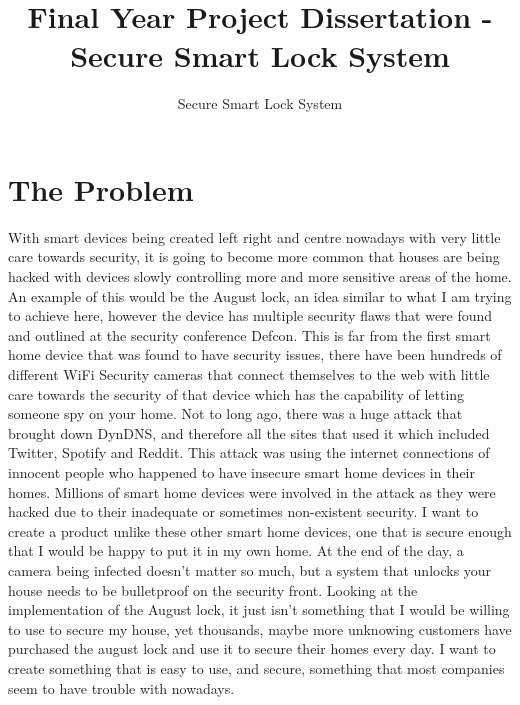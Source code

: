 \documentclass[10pt, a4paper]{article}
\begin{document}
\title{Final Year Project Dissertation - Secure Smart Lock System}
\author{Secure Smart Lock System}
\maketitle

\section{The Problem}
With smart devices being created left right and centre nowadays with very little care towards security, it is going to become more common that houses are being hacked with devices slowly controlling more and more sensitive areas of the home. An example of this would be the August lock, an idea similar to what I am trying to achieve here, however the device has multiple security flaws that were found and outlined at the security conference Defcon. This is far from the first smart home device that was found to have security issues, there have been hundreds of different WiFi Security cameras that connect themselves to the web with little care towards the security of that device which has the capability of letting someone spy on your home. Not to long ago, there was a huge attack that brought down DynDNS, and therefore all the sites that used it which included Twitter, Spotify and Reddit. This attack was using the internet connections of innocent people who happened to have insecure smart home devices in their homes. Millions of smart home devices were involved in the attack as they were hacked due to their inadequate or sometimes non-existent security.
\newline
\newline
I want to create a product unlike these other smart home devices, one that is secure enough that I would be happy to put it in my own home. At the end of the day, a camera being infected doesn't matter so much, but a system that unlocks your house needs to be bulletproof on the security front. Looking at the implementation of the August lock, it just isn't something that I would be willing to use to secure my house, yet thousands, maybe more unknowing customers have purchased the august lock and use it to secure their homes every day. I want to create something that is easy to use, and secure, something that most companies seem to have trouble with nowadays.
\end{document}
